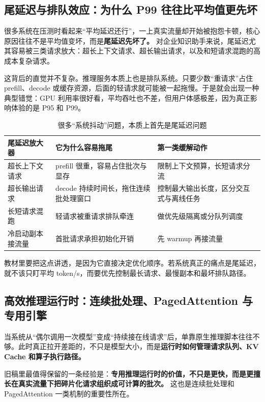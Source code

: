 \subsection{尾延迟与排队效应：为什么 P99 往往比平均值更先坏}
很多系统在压测时看起来“平均延迟还行”，一上真实流量却开始被抱怨卡顿，核心原因往往不是平均值变坏，而是\textbf{尾延迟先坏了。} 对企业知识助手来说，尾延迟尤其容易被三类请求放大：超长上下文请求、超长输出请求，以及和短请求混跑的高成本复杂请求。

这背后的直觉并不复杂。推理服务本质上也是排队系统。只要少数“重请求”占住 prefill、decode 或缓存资源，后面的轻请求就可能被一起拖慢。于是就会出现一种典型错觉：GPU 利用率很好看，平均吞吐也不差，但用户体感极差，因为真正影响体验的是 P95 和 P99。

\begin{table}[H]
\centering
\small
\begin{tabularx}{\textwidth}{>{\raggedright\arraybackslash}p{3cm}>{\raggedright\arraybackslash}p{3.2cm}>{\raggedright\arraybackslash}X}
\toprule
\textbf{尾延迟放大器} & \textbf{它为什么容易拖尾} & \textbf{第一类缓解动作} \\
\midrule
超长上下文请求 & prefill 很重，容易占住批次与显存 & 限制上下文预算，长短请求分流 \\
超长输出请求 & decode 持续时间长，拖住连续批处理窗口 & 控制最大输出长度，区分交互式与离线任务 \\
长短请求混跑 & 轻请求被重请求排队牵连 & 做优先级隔离或分队列调度 \\
冷启动副本接流量 & 首批请求承担初始化开销 & 先 warmup 再接流量 \\
\bottomrule
\end{tabularx}
\caption{很多“系统抖动”问题，本质上首先是尾延迟问题}
\label{tab:tail-latency-amplifiers}
\end{table}

教材里要把这点讲透，是因为它直接决定优化顺序。若系统真正的痛点是尾延迟，就不该只盯平均 token/s，而要优先控制最长请求、最慢副本和最坏排队路径。

\subsection{高效推理运行时：连续批处理、PagedAttention 与专用引擎}
当系统从“偶尔调用一次模型”变成“持续接在线请求”后，单靠原生推理脚本往往不够。此时真正拉开差距的，不只是模型大小，而是\textbf{运行时如何管理请求队列、KV Cache 和算子执行路径。}

旧稿里最值得保留的一条经验是：\textbf{专用推理运行时的价值，不只是更快，而是更擅长在真实流量下把碎片化请求组织成可计算的批次。} 这也是连续批处理和 PagedAttention 一类机制的重要性所在。

